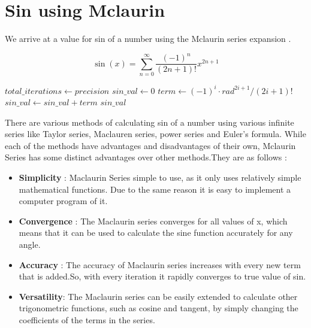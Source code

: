 \documentclass{report}
\begin{document}
\section{Sin using Mclaurin}
\begin{flushleft}
We arrive at a value for sin of a number using the Mclaurin series expansion \cite{doi:10.1137/1021091}.
\end{flushleft}
$$\sin(x) = \sum_{n=0}^{\infty} \frac{(-1)^n}{(2n+1)!}x^{2n+1}$$
\begin{algorithmic}[1]
        \State $total\_iterations \gets precision$
        \State $sin\_val \gets 0$
            \State $term \gets (-1)^i \cdot rad^{2i + 1} / (2i + 1)!$
            \State $sin\_val \gets sin\_val + term$
        \EndFor
        \State \Return $sin\_val$
    \EndFunction
\end{algorithmic}
\begin{flushleft}
There are various methods of calculating sin of a number using various infinite series like Taylor series, Maclauren series, power series and Euler's formula.
While each of the methods have advantages and disadvantages of their own, Mclaurin Series has some distinct advantages over other methods.They are as follows :
\end{flushleft}
\begin{itemize}
  \item \textbf{Simplicity} : Maclaurin Series simple to use, as it only uses relatively simple mathematical functions. Due to the same reason it is easy to implement a computer program of it.
  \item \textbf{Convergence} : The Maclaurin series converges for all values of x, which means that it can be used to calculate the sine function accurately for any angle.
  \item  \textbf{Accuracy} : The accuracy of Maclaurin series increases with every new term that is added.So, with every iteration it rapidly converges to true value of sin.
  \item \textbf{Versatility}: The Maclaurin series can be easily extended to calculate other trigonometric functions, such as cosine and tangent, by simply changing the coefficients of the terms in the series.
\end{itemize}
\end{document}
